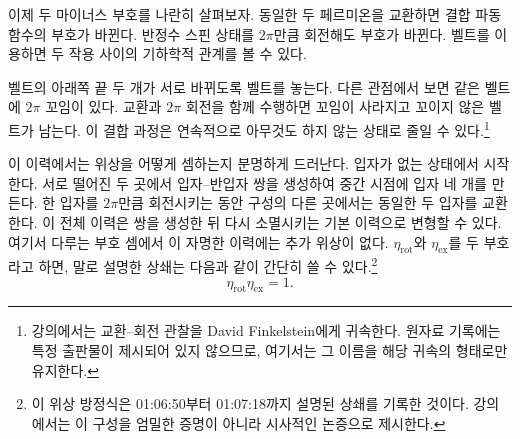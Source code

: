 이제 두 마이너스 부호를 나란히 살펴보자. 동일한 두 페르미온을 교환하면 결합 파동함수의 부호가 바뀐다. 반정수 스핀 상태를 \(2\pi\)만큼 회전해도 부호가 바뀐다. 벨트를 이용하면 두 작용 사이의 기하학적 관계를 볼 수 있다.

벨트의 아래쪽 끝 두 개가 서로 바뀌도록 벨트를 놓는다. 다른 관점에서 보면 같은 벨트에 \(2\pi\) 꼬임이 있다. 교환과 \(2\pi\) 회전을 함께 수행하면 꼬임이 사라지고 꼬이지 않은 벨트가 남는다. 이 결합 과정은 연속적으로 아무것도 하지 않는 상태로 줄일 수 있다.\footnote{강의에서는 교환--회전 관찰을 David Finkelstein에게 귀속한다. 원자료 기록에는 특정 출판물이 제시되어 있지 않으므로, 여기서는 그 이름을 해당 귀속의 형태로만 유지한다.}

\begin{classroomqa}
\end{classroomqa}

이 이력에서는 위상을 어떻게 셈하는지 분명하게 드러난다. 입자가 없는 상태에서 시작한다. 서로 떨어진 두 곳에서 입자--반입자 쌍을 생성하여 중간 시점에 입자 네 개를 만든다. 한 입자를 \(2\pi\)만큼 회전시키는 동안 구성의 다른 곳에서는 동일한 두 입자를 교환한다. 이 전체 이력은 쌍을 생성한 뒤 다시 소멸시키는 기본 이력으로 변형할 수 있다. 여기서 다루는 부호 셈에서 이 자명한 이력에는 추가 위상이 없다. \(\eta_{\mathrm{rot}}\)와 \(\eta_{\mathrm{ex}}\)를 두 부호라고 하면, 말로 설명한 상쇄는 다음과 같이 간단히 쓸 수 있다.\footnote{이 위상 방정식은 01:06:50부터 01:07:18까지 설명된 상쇄를 기록한 것이다. 강의에서는 이 구성을 엄밀한 증명이 아니라 시사적인 논증으로 제시한다.}
\begin{equation}
\eta_{\mathrm{rot}}\eta_{\mathrm{ex}}=1.
\end{equation}

\begin{classroomqa}
\end{classroomqa}

